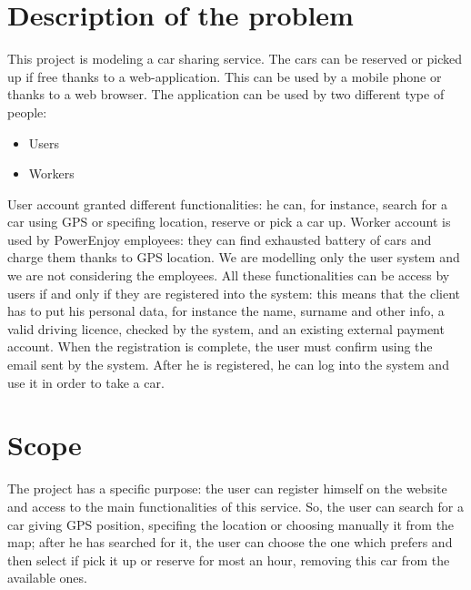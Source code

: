\documentclass[11pt,a4paper]{report}
\begin{document}
\section{Description of the problem}
This project is modeling a car sharing service.
The cars can be reserved or picked up if free thanks to a web-application.
This can be used by a mobile phone or thanks to a web browser.
The application can be used by two different type of people:
	\begin{itemize}
		\item Users
		\item Workers
	\end{itemize}
User account granted different functionalities: he can, for instance, search for a car using GPS or specifing location, reserve or pick a car up.
Worker account is used by PowerEnjoy employees: they can find exhausted battery of cars and charge them thanks to GPS location.
We are modelling only the user system and we are not considering the employees.
All these functionalities can be access by users if and only if they are registered into the system:
this means that the client has to put his personal data, for instance the name, surname and other info, a valid driving licence, checked by the system, and an existing external payment account.
When the registration is complete, the user must confirm using the email sent by the system.
After he is registered, he can log into the system and use it in order to take a car.
\section{Scope}
The project has a specific purpose: the user can register himself on the website and access to the main functionalities of this service.
So, the user can search for a car giving GPS position, specifing the location or choosing manually it from the map; after he has searched for it, the user can choose the one which prefers and then select if pick it up or reserve for most an hour, removing this car from the available ones.
\end{document}
